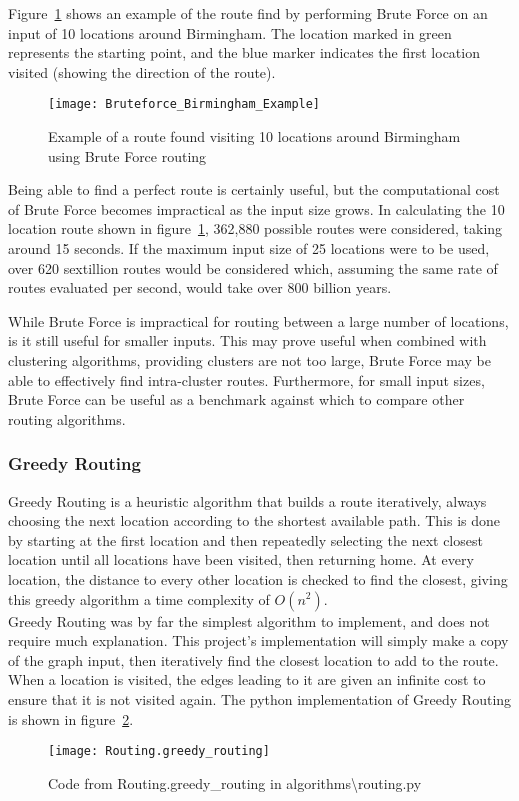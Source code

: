 \noindent
Figure~\ref{fig:Bruteforce_Birmingham_Example} shows an example of the route find by performing Brute Force on an input
of 10 locations around Birmingham.
The location marked in green represents the starting point, and the blue marker indicates the first location
visited (showing the direction of the route).
\begin{figure}[H]
    \centering
    \texttt{[image: Bruteforce\_Birmingham\_Example]}
    \caption{Example of a route found visiting 10 locations around Birmingham using Brute Force routing}
    \label{fig:Bruteforce_Birmingham_Example}
\end{figure}

\noindent
Being able to find a perfect route is certainly useful, but the computational cost of Brute Force becomes
impractical as the input size grows.
In calculating the 10 location route shown in figure~\ref{fig:Bruteforce_Birmingham_Example}, 362,880 possible routes
were considered, taking around 15 seconds.
If the maximum input size of 25 locations were to be used, over 620 sextillion routes would be considered \textemdash
which, assuming the same rate of routes evaluated per second, would take over 800 billion years.

While Brute Force is impractical for routing between a large number of locations, is it still useful for smaller inputs.
This may prove useful when combined with clustering algorithms, providing clusters are not too large, Brute Force
may be able to effectively find intra-cluster routes.
Furthermore, for small input sizes, Brute Force can be useful as a benchmark against which to compare other routing
algorithms.

\subsubsection{Greedy Routing}\label{subsubsec:greedy-routing}
Greedy Routing is a heuristic algorithm that builds a route iteratively, always choosing the next location according
to the shortest available path.
This is done by starting at the first location and then repeatedly selecting the next closest location until all
locations have been visited, then returning home.
At every location, the distance to every other location is checked to find the closest, giving this greedy algorithm a
time complexity of $O(n^2)$.\\

\noindent
Greedy Routing was by far the simplest algorithm to implement, and does not require much explanation.
This project's implementation will simply make a copy of the graph input, then iteratively find the closest location to
add to the route.
When a location is visited, the edges leading to it are given an infinite cost to ensure that it is not visited again.
The python implementation of Greedy Routing is shown in figure~\ref{fig:Routing.greedy_routing}.
\begin{figure}[H]
    \centering
    \texttt{[image: Routing.greedy\_routing]}
    \caption{Code from Routing.greedy\_routing in algorithms\textbackslash routing.py}
    \label{fig:Routing.greedy_routing}
\end{figure}

